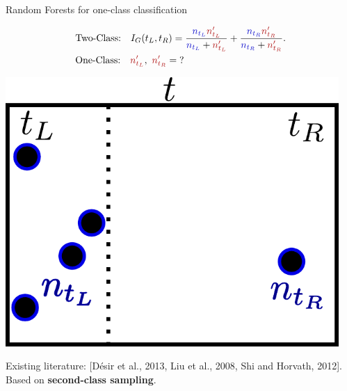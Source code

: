 \documentclass[9pt]{beamer}
\newcommand\red{\color{red} }
\newcommand\blue{\color{blue} }
\begin{document}
\begin{frame}
\begin{exampleblock}{Random Forests for one-class classification}
\begin{minipage}{0.65\textwidth}
\begin{align*}
&\text{Two-Class:}~~~
I_G(t_L, t_R)= \frac{{\blue n_{t_L}} {\red n'_{t_L}}}{{\blue n_{t_L}} +  {\red n'_{t_L}}} + \frac{{\blue n_{t_R}} {\red n'_{t_R}}}{{\blue n_{t_R}} +  {\red n'_{t_R}}}.\\
&\text{One-Class:}~~~ {\red n'_{t_L}},~ {\red n'_{t_R}} = \text{?}
\end{align*}

\end{minipage}
\begin{minipage}{0.3\textwidth}
	\centering
	\includegraphics[width=0.95\textwidth]{sourcefigs/tree_oc.pdf}
\end{minipage}

Existing literature:
{\small [Désir et al., 2013, Liu et al., 2008, Shi and Horvath, 2012].}\\
Based on \textbf{second-class sampling}.
\end{exampleblock}
\end{frame}
\end{document}
